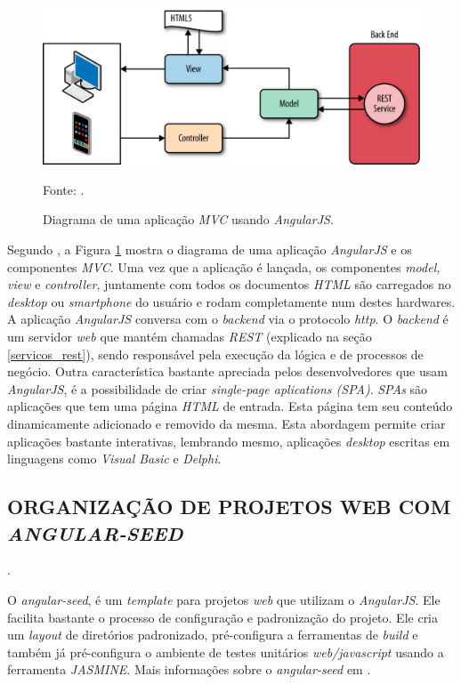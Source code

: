 \begin{figure}[ht]
	\centering
	\includegraphics[width=14cm]{figuras/angulajs_mvc.eps}
	\caption{Diagrama de uma aplicação \emph{MVC} usando \emph{AngularJS}.}
	\label{angularjs_mvc}
	\footnotesize Fonte:
	\cite{Williamson2015}.
\end{figure}
Segundo , a Figura \ref{angularjs_mvc} mostra o diagrama de uma aplicação \emph{AngularJS} e os componentes \emph{MVC}.  Uma vez que a aplicação é lançada, os componentes \emph{model, view} e \emph{controller}, juntamente com todos os documentos \emph{HTML} são carregados no \emph{desktop} ou \emph{smartphone} do usuário e rodam completamente num destes hardwares.  A aplicação \emph{AngularJS} conversa com o \emph{backend} via o protocolo \emph{http}.  O \emph{backend} é um servidor \emph{web} que mantém chamadas \emph{REST} (explicado na seção \ref{servicos_rest}), sendo responsável pela execução da lógica e de processos de negócio.  
Outra característica bastante apreciada pelos desenvolvedores que usam \emph{AngularJS}, é a possibilidade de criar \emph{single-page aplications (SPA)}. 
\emph{SPAs} são aplicações que tem uma página \emph{HTML} de entrada. 
Esta página tem seu conteúdo dinamicamente adicionado e removido da mesma.
Esta abordagem permite criar aplicações bastante interativas, lembrando mesmo, aplicações \emph{desktop} escritas em linguagens como \emph{Visual Basic} e \emph{Delphi}.

\subsection{ORGANIZAÇÃO DE PROJETOS WEB COM \emph{ANGULAR-SEED}}.
\label{angular_seed}

O \emph{angular-seed}, é um \emph{template} para projetos \emph{web} que utilizam o \emph{AngularJS}. 
Ele facilita bastante o processo de configuração e padronização do projeto. 
Ele cria um \emph{layout} de diretórios padronizado, pré-configura a ferramentas de \emph{build} e também já pré-configura o ambiente de testes unitários \emph{web/javascript} usando a ferramenta \emph{JASMINE}. 
Mais informações sobre o \emph{angular-seed} em .

